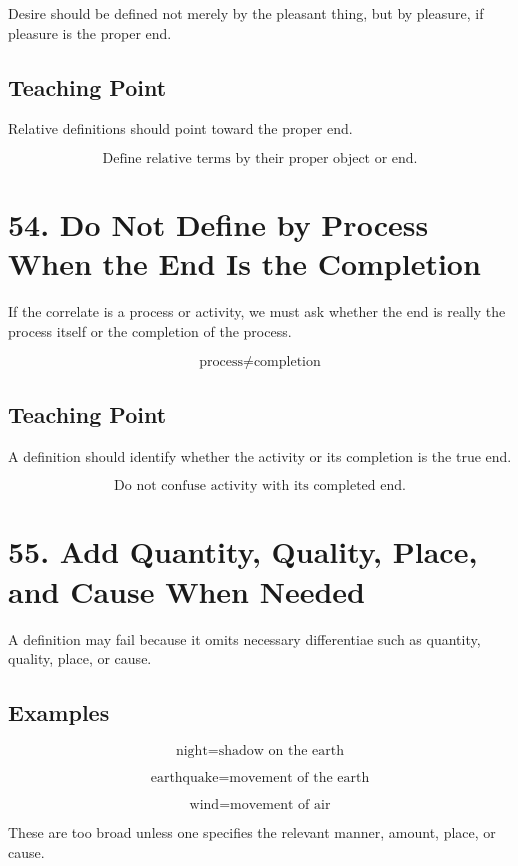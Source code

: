 \documentclass[12pt]{article}
\begin{document}
Desire should be defined not merely by the pleasant thing, but by pleasure, if
pleasure is the proper end.

\subsection*{Teaching Point}

Relative definitions should point toward the proper end.

\[
\boxed{
\text{Define relative terms by their proper object or end.}
}
\]

\section*{54. Do Not Define by Process When the End Is the Completion}

If the correlate is a process or activity, we must ask whether the end is really
the process itself or the completion of the process.

\[
\text{process} \neq \text{completion}
\]

\subsection*{Teaching Point}

A definition should identify whether the activity or its completion is the true
end.

\[
\boxed{
\text{Do not confuse activity with its completed end.}
}
\]

\section*{55. Add Quantity, Quality, Place, and Cause When Needed}

A definition may fail because it omits necessary differentiae such as quantity,
quality, place, or cause.

\subsection*{Examples}

\[
\text{night} = \text{shadow on the earth}
\]

\[
\text{earthquake} = \text{movement of the earth}
\]

\[
\text{wind} = \text{movement of air}
\]

These are too broad unless one specifies the relevant manner, amount, place, or
cause.
\end{document}

